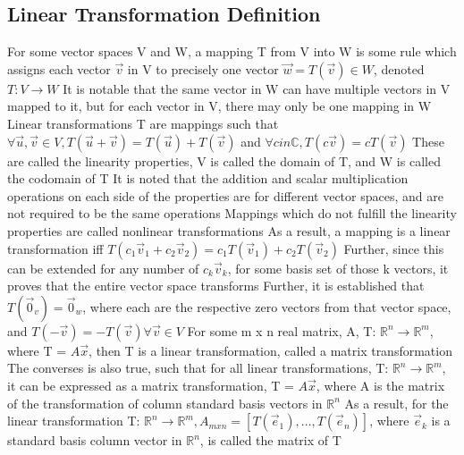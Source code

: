 \documentclass[11 pt, twoside]{article}
\newenvironment{outline*}
{
	\begin{outline}[enumerate]
	}
	{\end{outline}
}
\begin{document}
\subsection{Linear Transformation Definition}
\begin{outline*}
\1 For some vector spaces V and W, a mapping T from V into W is some rule which assigns each vector $\vec{v}$ in V to precisely one vector $\vec{w} = T(\vec{v}) \in W$, denoted $T: V \to W$
\2 It is notable that the same vector in W can have multiple vectors in V mapped to it, but for each vector in V, there may only be one mapping in W
\1 Linear transformations T are mappings such that $\forall \vec{u}, \vec{v} \in V, T(\vec{u} + \vec{v}) = T(\vec{u}) + T(\vec{v})$ and $\forall c in \mathbb{C}, T(c\vec{v}) = cT(\vec{v})$
\2 These are called the linearity properties, V is called the domain of T, and W is called the codomain of T
\2 It is noted that the addition and scalar multiplication operations on each side of the properties are for different vector spaces, and are not required to be the same operations
\2 Mappings which do not fulfill the linearity properties are called nonlinear transformations
\2 As a result, a mapping is a linear transformation iff $T(c_1\vec{v}_1 + c_2\vec{v}_2) = c_1T(\vec{v}_1) + c_2T(\vec{v}_2)$
\3 Further, since this can be extended for any number of $c_k\vec{v}_k$, for some basis set of those k vectors, it proves that the entire vector space transforms
\2 Further, it is established that $T(\vec{0}_v) = \vec{0}_w$, where each are the respective zero vectors from that vector space, and $T(-\vec{v}) = -T(\vec{v}) \forall \vec{v} \in V$
\1 For some m x n real matrix, A, T: $\mathbb{R}^n \to \mathbb{R}^m$, where T = $A\vec{x}$, then T is a linear transformation, called a matrix transformation
\2 The converses is also true, such that for all linear transformations, T: $\mathbb{R}^n \to \mathbb{R}^m$, it can be expressed as a matrix transformation, T = $A\vec{x}$, where A is the matrix of the transformation of column standard basis vectors in $\mathbb{R}^n$
\2 As a result, for the linear transformation T: $\mathbb{R}^n \to \mathbb{R}^m, A_{mxn} = [T(\vec{e}_1), \dots, T(\vec{e}_n)]$, where $\vec{e}_k$ is a standard basis column vector in $\mathbb{R}^n$, is called the matrix of T
\end{outline*}
\end{document}

